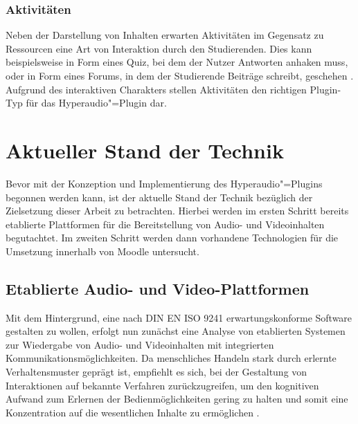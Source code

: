 \subsubsection{Aktivitäten}
Neben der Darstellung von Inhalten erwarten Aktivitäten im Gegensatz zu Ressourcen eine Art von Interaktion durch den Studierenden. Dies kann beispielsweise in Form eines Quiz, bei dem der Nutzer Antworten anhaken muss, oder in Form eines Forums, in dem der Studierende Beiträge schreibt, geschehen \citep{wild2017moodle}. Aufgrund des interaktiven Charakters stellen Aktivitäten den richtigen Plugin-Typ für das Hyperaudio"=Plugin dar.


\section{Aktueller Stand der Technik}
\label{sec:Technik}
Bevor mit der Konzeption und Implementierung des Hyperaudio"=Plugins begonnen werden kann, ist der aktuelle Stand der Technik bezüglich der Zielsetzung dieser Arbeit zu betrachten. Hierbei werden im ersten Schritt bereits etablierte Plattformen für die Bereitstellung von Audio- und Videoinhalten begutachtet. Im zweiten Schritt werden dann vorhandene Technologien für die Umsetzung innerhalb von Moodle untersucht.


\subsection{Etablierte Audio- und Video-Plattformen}

Mit dem Hintergrund, eine nach DIN EN ISO 9241 erwartungskonforme Software gestalten zu wollen, erfolgt nun zunächst eine Analyse von etablierten Systemen zur Wiedergabe von Audio- und Videoinhalten mit integrierten Kommunikationsmöglichkeiten. Da menschliches Handeln stark durch erlernte Verhaltensmuster geprägt ist, empfiehlt es sich, bei der Gestaltung von Interaktionen auf bekannte Verfahren zurückzugreifen, um den kognitiven Aufwand zum Erlernen der Bedienmöglichkeiten gering zu halten und somit eine Konzentration auf die wesentlichen Inhalte zu ermöglichen \citep{erwartungskonformitaet}.


